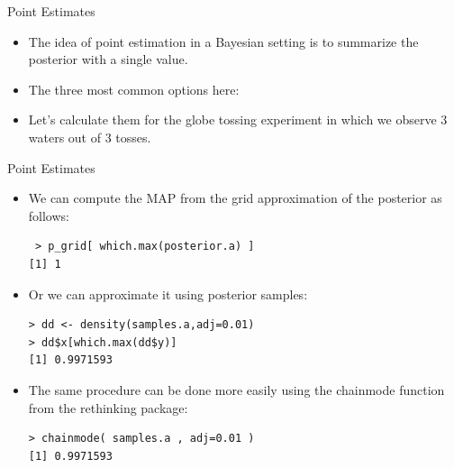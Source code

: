 \documentclass[handout]{beamer}
\begin{document}
\begin{frame}{Point Estimates}
\scriptsize{
\begin{itemize}

\item The idea of point estimation in a Bayesian setting is to summarize the posterior with a single value. 

\item The three most common options here:


\item Let's calculate them for the globe tossing experiment in which we observe 3 waters out of 3 tosses.



\end{itemize}



} 

\end{frame}



\begin{frame}[fragile]{Point Estimates}
\scriptsize{
\begin{itemize}

\item We can compute the MAP from the grid approximation of the posterior as follows:

\begin{verbatim}
 > p_grid[ which.max(posterior.a) ]
[1] 1
\end{verbatim}


\item Or we can approximate it using posterior samples:

\begin{verbatim}
> dd <- density(samples.a,adj=0.01)
> dd$x[which.max(dd$y)]
[1] 0.9971593 
\end{verbatim}

\item The same procedure can be done more easily using the chainmode function from the rethinking package:

\begin{verbatim}
> chainmode( samples.a , adj=0.01 )
[1] 0.9971593 
\end{verbatim}





\end{itemize}



} 

\end{frame}
\end{document}
